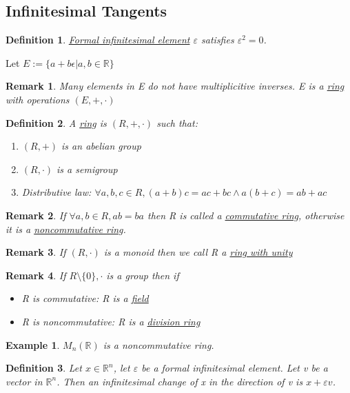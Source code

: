 \documentclass{article}
\newtheorem{definition}{Definition}
\newtheorem{example}{Example}
\newtheorem{remark}{Remark}
\begin{document}
\subsection{Infinitesimal Tangents}
\begin{definition}
  \underline{Formal infinitesimal element} $\varepsilon$ satisfies $\varepsilon^2 = 0$.
\end{definition}
Let $E := \{a + b\epsilon \vert a, b \in \mathbb{R}\}$
\begin{remark}
  Many elements in E do not have multiplicitive inverses. E is a \underline{ring} with operations $(E, +, \cdot)$
\end{remark}
\begin{definition}
  A \underline{ring} is $(R, +, \cdot)$ such that:
  \begin{enumerate}
    \item $(R, +)$ is an abelian group
    \item $(R, \cdot)$ is a semigroup
    \item Distributive law: $\forall a, b, c \in R, (a + b)c = ac + bc \land a(b + c) = ab + ac$
    
  \end{enumerate}
\end{definition}
\begin{remark}
  If $\forall a, b \in R, ab = ba$ then R is called a \underline{commutative ring}, otherwise it is a \underline{noncommutative ring}.
\end{remark}
\begin{remark}
  If $(R, \cdot)$ is a monoid then we call R a \underline{ring with unity}
\end{remark}
\begin{remark}
  If $R \setminus \{0\}, \cdot$ is a group then if
  \begin{itemize}
    \item R is commutative: R is a \underline{field}
    \item R is noncommutative: R is a \underline{division ring}
  \end{itemize}
\end{remark}
\begin{example}
  $M_n(\mathbb{R})$ is a noncommutative ring.
\end{example}
\begin{definition}
  Let $x \in \mathbb{R}^n$, let $\varepsilon$ be a formal infinitesimal element. Let v be a vector in $\mathbb{R}^n$. Then an infinitesimal change of x in the direction of v is $x + \varepsilon v$.
\end{definition}
\end{document}
